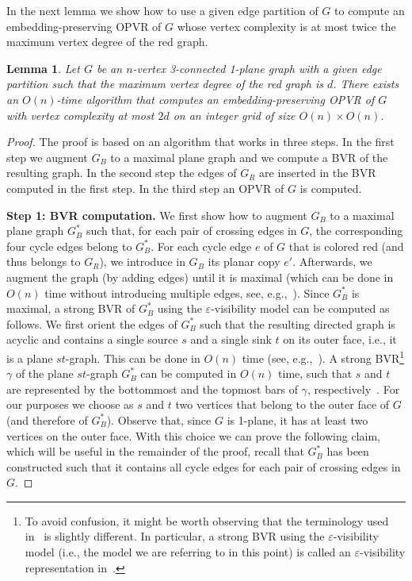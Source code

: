 \documentclass{article}
\newtheorem{lemma}{Lemma}
\newcommand{\opvr}{OPVR\xspace}
\begin{document}
In the next lemma we show how to use a given edge partition of $G$ to compute an embedding-preserving \opvr of $G$ whose vertex complexity is at most twice the maximum vertex degree of the red graph. 

\begin{lemma}\label{le:decomp-opvr}
Let $G$ be an $n$-vertex 3-connected 1-plane graph with a given edge partition such that the maximum vertex degree of the red graph is $d$. There exists an $O(n)$-time algorithm that computes an embedding-preserving \opvr of $G$ with vertex complexity at most $2d$ on an integer grid of size $O(n) \times O(n)$.
\end{lemma}
\begin{proof}
The proof is based on an algorithm that works in three steps. In the first step we augment $G_B$ to a maximal plane graph and we compute a BVR of the resulting graph. In the second step the edges of $G_R$ are inserted in the BVR computed in the first step. In the third step an \opvr of $G$ is computed.


\smallskip\noindent\textbf{Step 1: BVR computation.} We first show how to augment $G_B$ to a maximal plane graph $G^*_B$ such that, for each pair of crossing edges in $G$, the corresponding four cycle edges belong to $G^*_B$. For each cycle edge $e$ of $G$ that is colored red (and thus belongs to $G_R$), we introduce in $G_B$ its planar copy $e'$. Afterwards, we augment the graph (by adding edges) until it is maximal  (which can be done in $O(n)$ time without introducing multiple edges, see, e.g.,~\cite{DBLP:conf/swat/KantB92}). Since $G^*_B$ is maximal, a strong BVR of $G^*_B$ using the $\varepsilon$-visibility model can be computed as follows. We first orient the edges of $G^*_B$ such that the resulting directed graph is acyclic and contains a single source $s$ and a single sink $t$ on its outer face, i.e., it is a plane $st$-graph. This can be done in $O(n)$ time (see, e.g.,~\cite{DBLP:journals/dcg/RosenstiehlT86,TamassiaTollis86}). A strong BVR\footnote{To avoid confusion, it might be worth observing that the terminology used in~\cite{TamassiaTollis86} is slightly different. In particular, a strong BVR using the $\varepsilon$-visibility model (i.e., the model we are referring to in this point) is called an $\varepsilon$-visibility representation in~\cite{TamassiaTollis86}. } $\gamma$ of the plane $st$-graph $G^*_B$ can be computed in $O(n)$ time, such that $s$ and $t$ are represented by the bottommost and the topmost bars of $\gamma$, respectively~\cite{TamassiaTollis86}.
For our purposes we choose as $s$ and $t$ two vertices that belong to the outer face of $G$ (and therefore of $G^*_B$). Observe that, since $G$ is 1-plane, it has at least two vertices on the outer face.  With this choice we can prove the following claim, which will be useful in the remainder of the proof, recall that $G_B^*$ has been constructed such that it contains all cycle edges for each pair of crossing edges in $G$.



\end{proof}
\end{document}
